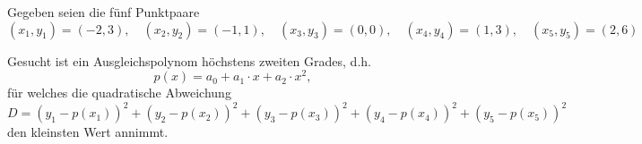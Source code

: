 Gegeben seien die fünf Punktpaare
\[
(x_1, y_1) = (-2, 3), \quad (x_2, y_2) = (-1, 1), \quad (x_3, y_3) = (0, 0), \quad (x_4, y_4) = (1, 3), \quad (x_5, y_5) = (2, 6)
\]

Gesucht ist ein Ausgleichspolynom höchstens zweiten Grades, d.h.
\[
p(x) = a_0 + a_1 \cdot x + a_2 \cdot x^2,
\]
für welches die quadratische Abweichung
\[
D = (y_1 - p(x_1))^2 + (y_2 - p(x_2))^2 + (y_3 - p(x_3))^2 + (y_4 - p(x_4))^2 + (y_5 - p(x_5))^2
\]
den kleinsten Wert annimmt.
